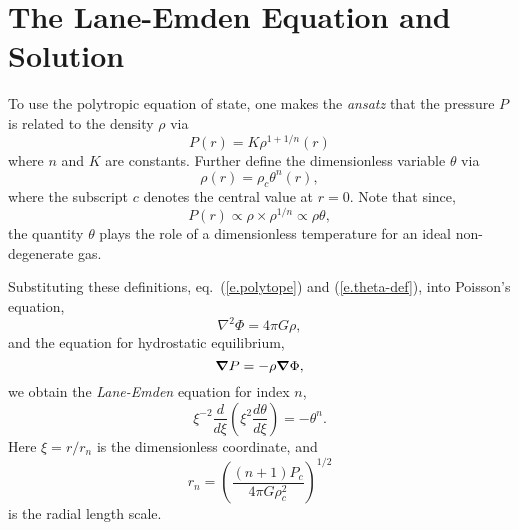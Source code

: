 \section{The Lane-Emden Equation and Solution}\label{s.LE-solution}

To use the polytropic equation of state, one makes the \emph{ansatz} that the pressure $P$ is related to the density $\rho$ via
\begin{equation}\label{e.polytope}
P(r) = K\rho^{1+1/n}(r)
\end{equation}
where $n$ and $K$ are constants. Further define the dimensionless variable $\theta$ via
\begin{equation}\label{e.theta-def}
\rho(r) = \rho_{c}\theta^{n}(r),
\end{equation}
where the subscript $c$ denotes the central value at $r=0$. Note that since, 
\[ P(r) \propto \rho \times \rho^{1/n} \propto \rho \theta, \]
the quantity $\theta$ plays the role of a dimensionless temperature for an ideal non-degenerate gas.

Substituting these definitions, eq.~(\ref{e.polytope}) and (\ref{e.theta-def}), into Poisson's equation,
\begin{equation}
\nabla^{2}\Phi = 4\pi G\rho,
\end{equation}
and the equation for hydrostatic equilibrium, 
\begin{equation}
\boldsymbol{\nabla} P = -\rho\boldsymbol{\nabla} \Phi,
\end{equation}
we obtain the \emph{Lane-Emden} equation for index $n$,
\begin{equation}\label{e.LE}
\xi^{-2} \frac{d}{d\xi}\left(\xi^{2}\frac{d\theta}{d\xi}\right) = -\theta^{n}.
\end{equation}
Here $\xi = r/r_{n}$ is the dimensionless coordinate, and
\begin{equation}
r_{n} = \left(\frac{(n+1)P_{c}}{4\pi G\rho_{c}^{2}}\right)^{1/2}
\end{equation}
is the radial length scale.

